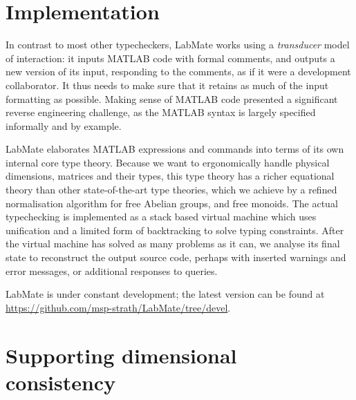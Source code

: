 \documentclass{ws-procs9x6}
\newcommand{\remph}{\emph}
\begin{document}

\section{Implementation}

In contrast to most other typecheckers, LabMate works using a
\remph{transducer} model of interaction: it inputs MATLAB code with
formal comments, and outputs a new version of its input, responding to
the comments, as if it were a development collaborator.  It thus needs
to make sure that it retains as much of the input formatting as
possible.  Making sense of MATLAB code presented a significant reverse
engineering challenge, as the MATLAB syntax is largely specified
informally and by example.

LabMate elaborates MATLAB expressions and commands into terms of its own internal core type theory.
%
Because we want to ergonomically handle physical dimensions, matrices
and their types, this type theory has a richer equational theory than
other state-of-the-art type theories, which we achieve by a refined
normalisation algorithm for free Abelian groups, and free monoids.
%
The actual typechecking is implemented as a stack based virtual machine which uses unification and a limited form of backtracking to solve typing constraints.
%
After the virtual machine has solved as many problems as it can, we analyse its final state to reconstruct the output source code, perhaps with inserted warnings and error messages, or additional responses to queries.

LabMate is under constant development; the latest version can be found at \url{https://github.com/msp-strath/LabMate/tree/devel}.

\section{Supporting dimensional consistency}
\label{sec:example-revisited}

\end{document}
